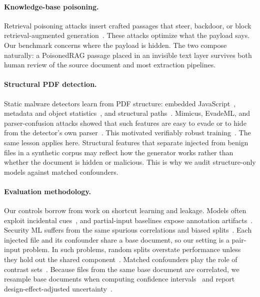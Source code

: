 \paragraph{Knowledge-base poisoning.}
Retrieval poisoning attacks insert crafted passages that steer, backdoor, or
block retrieval-augmented
generation~\cite{zhong2023poisoning,zou2025poisonedrag,xue2024badrag,chaudhari2024phantom,shafran2025machine,chen2024agentpoison}.
These attacks optimize what the payload says. Our benchmark concerns where
the payload is hidden. The two compose naturally: a PoisonedRAG passage
placed in an invisible text layer survives both human review of the source
document and most extraction pipelines.

\paragraph{Structural PDF detection.}
Static malware detectors learn from PDF structure: embedded
JavaScript~\cite{laskov2011static}, metadata and object
statistics~\cite{smutz2012malicious}, and structural
paths~\cite{srndic2013detection,srndic2016hidost}. Mimicus, EvadeML, and
parser-confusion attacks showed that such features are easy to evade or
to hide from the detector's own parser~\cite{srndic2014practical,xu2016automatically,carmony2016extract,maiorca2019towards}.
This motivated verifiably robust training~\cite{chen2020training}. The same
lesson applies here. Structural features that separate injected from benign
files in a synthetic corpus may reflect how the generator works rather than
whether the document is hidden or malicious. This is why we audit
structure-only models against matched confounders.

\paragraph{Evaluation methodology.}
Our controls borrow from work on shortcut learning and leakage. Models
often exploit incidental cues~\cite{geirhos2020shortcut,lapuschkin2019unmasking,mccoy2019right},
and partial-input baselines expose annotation
artifacts~\cite{gururangan2018annotation}. Security ML suffers from the same
spurious correlations and biased splits~\cite{arp2022dos,pendlebury2019tesseract,warnecke2020evaluating,kapoor2023leakage}.
Each injected file and its confounder share a base document, so our setting
is a pair-input problem. In such problems, random splits overstate
performance unless they hold out the shared component~\cite{park2012flaws,pahikkala2015toward,bernett2024cracking}.
Matched confounders play the role of contrast
sets~\cite{gardner2020evaluating,kaushik2020learning}. Because files from the
same base document are correlated, we resample base documents when computing
confidence intervals~\cite{field2007bootstrapping,davison1997bootstrap} and
report design-effect-adjusted
uncertainty~\cite{kish1965survey,dean2015evaluating}.
